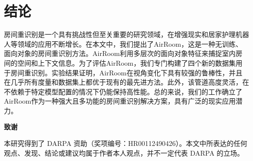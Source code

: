 \vspace{-5pt}
\section{结论}
\vspace{-5pt}
\label{sec:conclusion}

房间重识别是一个具有挑战性但至关重要的研究领域，在增强现实和居家护理机器人等领域的应用不断增长。在本文中，我们提出了AirRoom，这是一种无训练、面向对象的房间重识别方法。AirRoom利用多层次的面向对象特征来捕捉室内房间的空间和上下文信息。为了评估AirRoom，我们专门构建了四个新的数据集用于房间重识别。实验结果证明，AirRoom在视角变化下具有较强的鲁棒性，并且在几乎所有度量和数据集上都优于现有的最先进方法。此外，该管道高度灵活，在不依赖于特定模型配置的情况下仍能保持高性能。总的来说，我们的工作确立了AirRoom作为一种强大且多功能的房间重识别解决方案，具有广泛的现实应用潜力。

\begin{center}
\textbf{致谢}
\end{center}
\begin{sloppypar}
\noindent 本研究得到了 DARPA 资助（奖项编号：HR00112490426）。本文中所表达的任何观点、发现、结论或建议均属于作者本人观点，并不一定代表 DARPA 的立场。
\end{sloppypar}
